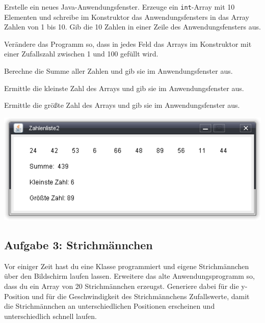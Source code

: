 \begin{compactenum}[a)]
\item Erstelle ein neues Java-Anwendungsfenster. Erzeuge ein
\lstinline|int|-Array mit 10 Elementen und schreibe im Konstruktor das
Anwendungsfensters in das Array Zahlen von 1 bis 10. Gib die 10 Zahlen in einer
Zeile des Anwendungsfensters aus.

\item Verändere das Programm so, dass in jedes Feld das Arrays im Konstruktor
mit einer Zufallszahl zwischen 1 und 100 gefüllt wird.

\begin{minipage}{0.35\textwidth}
\item Berechne die Summe aller Zahlen und gib sie im Anwendungsfenster aus.

\item Ermittle die kleinste Zahl des Arrays und gib sie im Anwendungsfenster
aus.

\item Ermittle die größte Zahl des Arrays und gib sie im Anwendungsfenster aus.
\end{minipage}
\hfill
\begin{minipage}{0.65\textwidth}
\includegraphics[width=1.0\textwidth]{./inf/SEKII/18_Java_Arrays/Aufgabe2.png}
\end{minipage}
\end{compactenum}


\subsection{Aufgabe 3: Strichmännchen}

Vor einiger Zeit hast du eine Klasse  programmiert und
eigene Strichmännchen über den Bildschirm laufen lassen. Erweitere das alte
Anwendungsprogramm so, dass du ein Array von 20 Strichmännchen erzeugst.
Generiere dabei für die y-Position und für die Geschwindigkeit des
Strichmännchens Zufallswerte, damit die Strichmännchen an unterschiedlichen
Positionen erscheinen und unterschiedlich schnell laufen.


